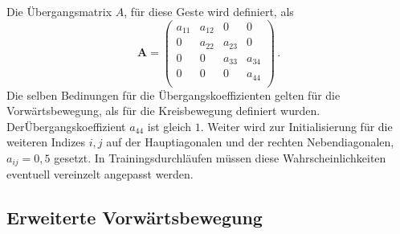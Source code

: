 Die \"Ubergangsmatrix $A$, f\"ur diese Geste wird definiert, als
\begin{equation}
\mathbf{A} = 
\begin{pmatrix}
a_{11} & a_{12} & 0 & 0\\
0 & a_{22} & a_{23} & 0 \\
0 & 0 & a_{33} & a_{34}\\
0 & 0 & 0 & a_{44} \\
\end{pmatrix} \, .
\end{equation}
Die selben Bedinungen f\"ur die \"Ubergangskoeffizienten gelten f\"ur die Vorw\"artsbewegung, als f\"ur die Kreisbewegung definiert wurden. 
\newline
Der\"Ubergangskoeffizient $a_{44}$ ist gleich $1$. Weiter wird zur Initialisierung f\"ur die weiteren Indizes $i, j$ auf der Hauptiagonalen und der rechten Nebendiagonalen, $a_{ij} = 0,5$ gesetzt. In Trainingsdurchl\"aufen m\"ussen diese Wahrscheinlichkeiten eventuell vereinzelt angepasst werden.

\subsection{Erweiterte Vorw\"artsbewegung}
\label{subsec:gesture-extforward}

